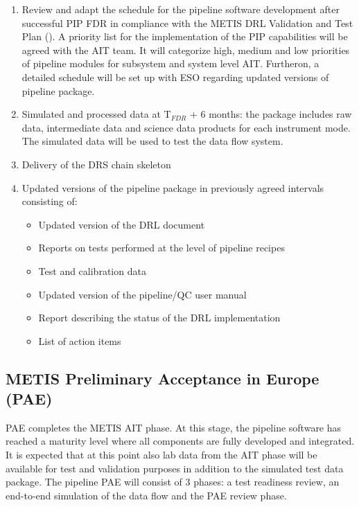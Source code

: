 \begin{enumerate}
    \item Review and adapt the schedule for the pipeline software development after successful PIP FDR in compliance with the METIS DRL Validation and Test Plan (\cite{DRLVT}). A priority list for the implementation of the PIP capabilities will be agreed with the AIT team. It will categorize high, medium and low priorities of pipeline modules for subsystem and system level AIT. Furtheron, a detailed schedule will be set up with ESO regarding updated versions of pipeline package.
    \item Simulated and processed data at T$_{FDR}$ + 6 months: the package includes raw data, intermediate data and science data products for each instrument mode. The simulated data will be used to test the data flow system.
    \item Delivery of the DRS chain skeleton
    \item Updated versions of the pipeline package in previously agreed intervals consisting of:
    \begin{itemize}
        \item Updated version of the DRL document
        \item Reports on tests performed at the level of pipeline recipes
        \item Test and calibration data
        \item Updated version of the pipeline/QC user manual
        \item Report describing the status of the DRL implementation
        \item List of action items
    \end{itemize}
\end{enumerate}


\subsection{METIS Preliminary Acceptance in Europe (PAE)}
\label{ssec:pae_europe}

PAE completes the METIS AIT phase. At this stage, the pipeline software has reached a maturity level where all components are fully developed and integrated. It is expected that at this point also lab data from the AIT phase will be available for test and validation purposes in addition to the simulated test data package. The pipeline PAE will consist of 3 phases: a test readiness review, an end-to-end simulation of the data flow and the PAE review phase.

